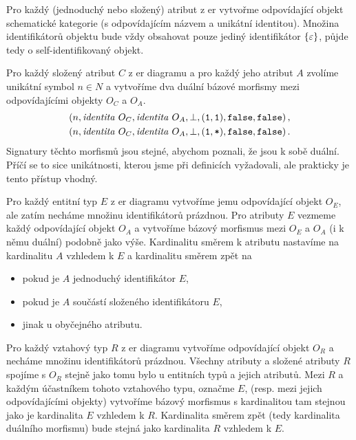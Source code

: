 Pro každý (jednoduchý nebo složený) atribut z \acrshort{er} vytvořme odpovídající objekt schematické kategorie (s odpovídajícím názvem a unikátní identitou).
Množina identifikátorů objektu bude vždy obsahovat pouze jediný identifikátor $\left\{\varepsilon\right\}$, půjde tedy o self-identifikovaný objekt.

Pro každý složený atribut $C$ z \acrshort{er} diagramu a pro každý jeho atribut $A$ zvolíme unikátní symbol $n\in N$ a vytvoříme dva duální bázové morfismy mezi odpovídajícími objekty $O_C$ a $O_A$.
\begin{align*}
  (n, \mathit{identita}\ O_C, \mathit{identita}\ O_A, \bot, (\texttt{1}, \texttt{1}), \texttt{false}, \texttt{false})\,, \\
  (n, \mathit{identita}\ O_C, \mathit{identita}\ O_A, \bot, (\texttt{1}, \texttt{*}), \texttt{false}, \texttt{false})\,.
\end{align*}
Signatury těchto morfismů jsou stejné, abychom poznali, že jsou k sobě duální.
Příčí se to sice unikátnosti, kterou jsme při definicích vyžadovali, ale prakticky je tento přístup vhodný.

Pro každý entitní typ $E$ z \acrshort{er} diagramu vytvoříme jemu odpovídající objekt $O_E$, ale zatím necháme množinu identifikátorů prázdnou.
Pro atributy $E$ vezmeme každý odpovídající objekt $O_A$ a vytvoříme bázový morfismus mezi $O_E$ a $O_A$ (i k němu duální) podobně jako výše.
Kardinalitu směrem k atributu nastavíme na kardinalitu $A$ vzhledem k $E$ a kardinalitu směrem zpět na
\begin{itemize}
  \item \oneone{} pokud je $A$ jednoduchý identifikátor $E$,
  \item \onemany{} pokud je $A$ součástí složeného identifikátoru $E$,
  \item jinak \zeromany{} u obyčejného atributu.
\end{itemize}

Pro každý vztahový typ $R$ z \acrshort{er} diagramu vytvoříme odpovídající objekt $O_R$ a necháme množinu identifikátorů prázdnou.
Všechny atributy a složené atributy $R$ spojíme s $O_R$ stejně jako tomu bylo u entitních typů a jejich atributů.
Mezi $R$ a každým účastníkem tohoto vztahového typu, označme $E$, (resp. mezi jejich odpovídajícími objekty) vytvoříme bázový morfismus s kardinalitou tam stejnou jako je kardinalita $E$ vzhledem k $R$.
Kardinalita směrem zpět (tedy kardinalita duálního morfismu) bude stejná jako kardinalita $R$ vzhledem k $E$.

